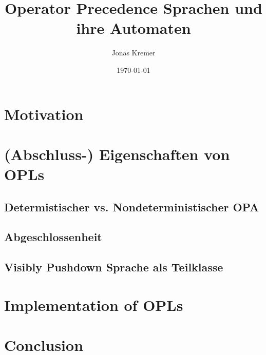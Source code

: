 \documentclass{article}
\author{Jonas Kremer}
\title{Operator Precedence Sprachen und ihre Automaten}
\date{\today{}}
\begin{document}
\maketitle
\newpage
\tableofcontents
\newpage

\section{Motivation}




\section{(Abschluss-) Eigenschaften von OPLs}

\subsection{Determistischer vs. Nondeterministischer OPA}

\subsection{Abgeschlossenheit}

\subsection{Visibly Pushdown Sprache als Teilklasse}

\section{Implementation of OPLs}

\section{Conclusion}


\end{document}
